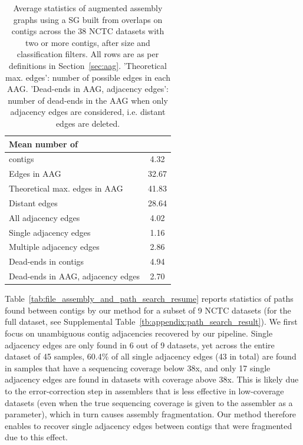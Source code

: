 \documentclass[./main.tex]{subfiles}
\newcommand{\modafterreview}[1]{#1}
\begin{document}
\begin{table}[]
    \centering
    \small
    \modafterreview{
    \begin{tabular}{l c}
        Mean number of& \\
        \hline
         \canu contigs & 4.32 \\
         \hline
         Edges in AAG & 32.67 \\
         Theoretical max. edges in AAG & 41.83 \\
         Distant edges & 28.64 \\
         All adjacency edges & 4.02 \\
         Single adjacency edges & 1.16 \\
         Multiple adjacency edges & 2.86 \\
         \hline
         Dead-ends in \canu contigs &  4.94 \\
         Dead-ends in AAG, adjacency edges & 2.70 \\ %
        \hline
    \end{tabular}}
    \caption{Average statistics of augmented assembly graphs using a SG built from \minimap overlaps on \canu contigs across the \modafterreview{38} NCTC datasets \modafterreview{with two or more contigs, after size and classification filters}.
    All rows are as per definitions in Section~\ref{sec:aag}. 'Theoretical max. edges': number of possible edges in each AAG. 'Dead-ends in AAG, adjacency edges': number of dead-ends in the AAG when only adjacency edges are considered, i.e. distant edges are deleted.
    \label{tab:path_search_resume}}
\end{table}


Table~\ref{tab:file_assembly_and_path_search_resume} reports statistics of paths found between \canu contigs by our method for a subset of 9 NCTC datasets (for the full dataset, see Supplemental Table~\ref{tb:appendix:path_search_result}). 
\modafterreview{We first focus on unambiguous contig adjacencies recovered by our pipeline.}
Single adjacency edges are only found in \modafterreview{6} out of 9 datasets, yet across the entire dataset of 45 samples, \modafterreview{60.4\%} of all single adjacency edges (\modafterreview{43} in total) are found in samples that have a sequencing coverage below 38x, and only \modafterreview{17} single adjacency edges are found in datasets with coverage above 38x. This is likely due to the error-correction step in assemblers that is less effective in low-coverage datasets (even when the true sequencing coverage is given to the assembler as a parameter), which in turn causes assembly fragmentation. Our method therefore enables to recover single adjacency edges between contigs that were fragmented due to this effect. 
\end{document}
